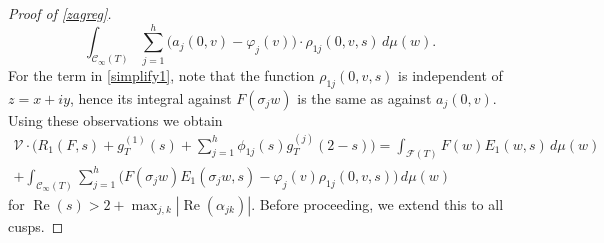 \documentclass[12pt,reqno]{amsart}
\numberwithin{equation}{section}
\renewcommand{\Re}{\operatorname{Re}}
\begin{document}
\begin{proof}[Proof of \cref{zagreg}]
\begin{equation*}
    \int_{\mathcal{C}_{\infty}(T)} \sum_{j=1}^h \big( a_{j}(0,v)-\varphi_{j}(v) \big) \cdot \rho_{1 j}(0,v,s) \, d \mu(w).
\end{equation*}
For the term in \eqref{simplify1}, note that the function $\rho_{1 j}(0,v,s)$
is independent of $z=x+iy$, hence its integral against $F(\sigma_{j} w)$
is the same as against $a_{j}(0,v)$. Using these observations we obtain 
\begin{equation}\label{simplify3}
\begin{aligned}
    \mathcal{V} \cdot \Big(R_{1}(F,s)+ g^{(1)}_{T}(s)+\sum_{j=1}^{h} \phi_{1 j}(s) g^{(j)}_{T}(2-s) \Big) =\int_{\mathcal{F}(T)} F(w) E_{1}(w,s) \, d \mu(w)  \\
    +\int_{\mathcal{C}_{\infty}(T)}  \sum_{j=1}^{h}
    \Big(F(\sigma_{j} w) E_{1}( \sigma_{j}w,s)-\varphi_{j}(v) \rho_{1 j}(0,v,s) \Big) \, d \mu(w)
\end{aligned}
\end{equation}
for $\Re(s)>2 + \max_{j,k} \left|\Re(\alpha_{jk})\right|$. Before proceeding, we extend this to all cusps.




\end{proof}
\end{document}
